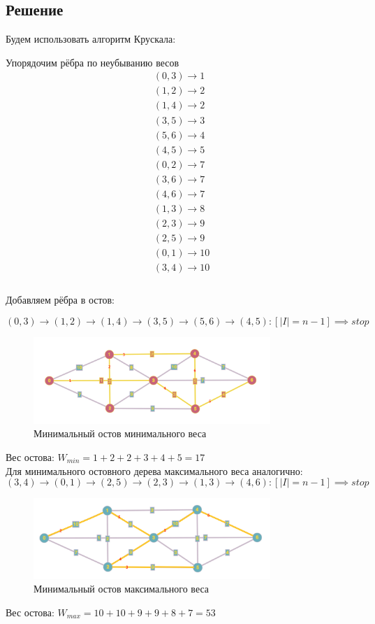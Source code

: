 \documentclass[a4paper,14pt]{extreport}
\begin{document}
\subsection{Решение}
Будем использовать алгоритм Крускала:\par
Упорядочим рёбра по неубыванию весов
\begin{equation*}
\begin{multlined}
    (0,3) \to 1\\
    (1,2) \to 2\\
    (1,4) \to 2\\
    (3,5) \to 3\\
    (5,6) \to 4\\
    (4,5) \to 5\\
    (0,2) \to 7\\
    (3,6) \to 7\\
    (4,6) \to 7\\
    (1,3) \to 8\\
    (2,3) \to 9\\
    (2,5) \to 9\\
    (0,1) \to 10\\
    (3,4) \to 10\\
\end{multlined}
\end{equation*}\\

Добавляем рёбра в остов:\par
\begin{equation*}
    (0,3) \to (1,2) \to (1,4) \to (3,5) \to (5,6) \to (4,5): [|I| = n-1] \implies stop
\end{equation*}

\begin{figure}[h]
    \centering
    \includegraphics[width=0.8\textwidth]{graph2.png}
    \caption{Минимальный остов минимального веса}
\end{figure}

Вес остова: $W_{min} = 1+2+2+3+4+5=17$ \\

Для минимального остовного дерева максимального веса аналогично:
\begin{equation*}
    (3,4) \to (0,1) \to (2,5) \to (2,3) \to (1,3) \to (4,6): [|I| = n-1] \implies stop
\end{equation*}

\begin{figure}[h]
    \centering
    \includegraphics[width=0.8\textwidth]{graph3.png}
    \caption{Минимальный остов максимального веса}
\end{figure}

Вес остова: $W_{max} = 10+10+9+9+8+7=53$ \\
\end{document}
